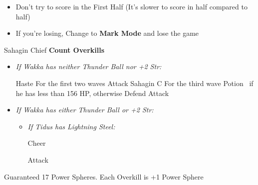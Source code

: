 \begin{blitzball}
\begin{itemize}
\begin{itemize}
\begin{itemize}
                \begin{itemize}
                    \item If 1 Defender and 2:49, Sphere Shot over the Defender
                    \item Otherwise, Break and Sphere Shot
                    \item If 2 Defenders, Break 1, Sphere Shot
                \end{itemize}
            \end{itemize}
            \item If you need to Score or it's 1-1, then do the same as above with Jassu
            \item Wait until 4:20 then aggro Balgerda, Pass to \wakka
            \wakkaf swim close and Venom Shot, or Break, Venom Shot
        \end{itemize}
        \item Don't try to score in the First Half (It's slower to score in  half compared to  half)
        \item If you're losing, Change to \textbf{Mark Mode} and lose the game
    \end{itemize}
\end{blitzball}
\begin{battle}{Sahagin Chief}
    \textbf{Count Overkills}
    \begin{itemize}
        \item \textit{If Wakka has neither Thunder Ball nor +2 Str:}
        \begin{itemize}
            \tidusf Haste \tidus
            \wakkaf For the first two waves Attack Sahagin C
            \wakkaf For the third wave Potion \tidus\ if he has less than 156 HP, otherwise Defend
            \tidusf Attack
        \end{itemize}
        \item \textit{If Wakka has either Thunder Ball or +2 Str:}
        \begin{itemize}
            \tidusf Cheer
            \wakkaf Attack
            \tidusf Haste \tidus
            \tidusf Haste \wakka
            \item \textit{If Tidus has Lightning Steel:}
            \begin{itemize}
                \tidusf Cheer
            \end{itemize}
            \tidusf Attack
        \end{itemize}
    \end{itemize}
    Guaranteed 17 Power Spheres. Each Overkill is +1 Power Sphere
\end{battle}
